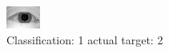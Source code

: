 \begin{figure}[h!]
\begin{center}
\includegraphics[width=0.60\columnwidth]{figures/ID889_class_1_target_2.png}
\end{center}
\caption{ Classification: 1 actual target: 2}
\label{fig:ID889_class_1_target_2}
\end{figure}
